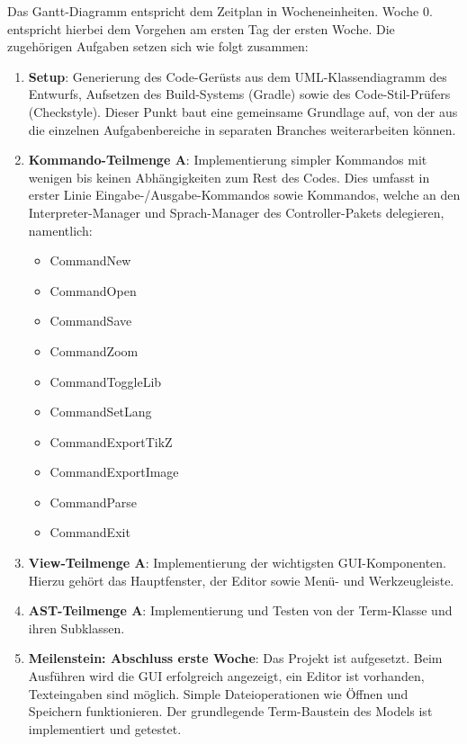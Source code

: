 \documentclass[parskip=full,11pt,twoside]{scrartcl}
\begin{document}
Das Gantt-Diagramm entspricht dem Zeitplan in Wocheneinheiten. Woche 0. entspricht hierbei dem Vorgehen am ersten Tag der ersten Woche. Die zugehörigen Aufgaben setzen sich wie folgt zusammen:
\begin{enumerate}
	\item \textbf{Setup}: Generierung des Code-Gerüsts aus dem UML-Klassendiagramm des Entwurfs, Aufsetzen des Build-Systems (Gradle) sowie des Code-Stil-Prüfers (Checkstyle). Dieser Punkt baut eine gemeinsame Grundlage auf, von der aus die einzelnen Aufgabenbereiche in separaten Branches weiterarbeiten können.
	
	\item \textbf{Kommando-Teilmenge A}: Implementierung simpler Kommandos mit wenigen bis keinen Abhängigkeiten zum Rest des Codes. Dies umfasst in erster Linie Eingabe-/Ausgabe-Kommandos sowie Kommandos, welche an den Interpreter-Manager und Sprach-Manager des Controller-Pakets delegieren, namentlich:
	\begin{multicols}{3}
		\begin{itemize}
			\item CommandNew
			\item CommandOpen
			\item CommandSave
			\item CommandZoom

			\item CommandToggleLib
			\item CommandSetLang
			\item CommandExportTikZ
			\item CommandExportImage

			\item CommandParse
			\item CommandExit
		\end{itemize}
	\end{multicols}

	\item \textbf{View-Teilmenge A}: Implementierung der wichtigsten GUI-Komponenten. Hierzu gehört das Hauptfenster, der Editor sowie Menü- und Werkzeugleiste.
	
	\item \textbf{AST-Teilmenge A}: Implementierung und Testen von der Term-Klasse und ihren Subklassen.
	
	\item \textbf{Meilenstein: Abschluss erste Woche}: Das Projekt ist aufgesetzt. Beim Ausführen wird die GUI erfolgreich angezeigt, ein Editor ist vorhanden, Texteingaben sind möglich. Simple Dateioperationen wie Öffnen und Speichern funktionieren. Der grundlegende Term-Baustein des Models ist implementiert und getestet.


\end{enumerate}
\end{document}
